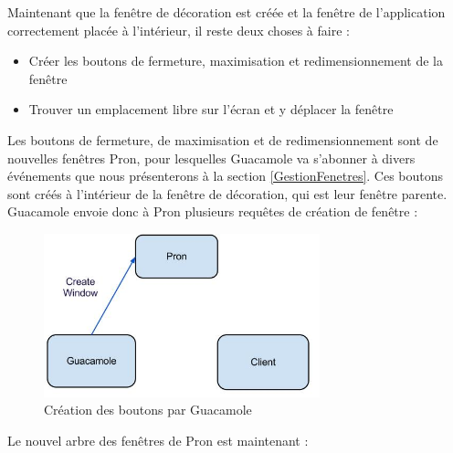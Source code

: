 \begin{center}
\end{center}

Maintenant que la fenêtre de décoration est créée et la fenêtre de l'application correctement placée à l'intérieur, il reste deux choses à faire :

\begin{itemize}
  \item Créer les boutons de fermeture, maximisation et redimensionnement de la fenêtre
  \item Trouver un emplacement libre sur l'écran et y déplacer la fenêtre
\end{itemize}

Les boutons de fermeture, de maximisation et de redimensionnement sont de nouvelles fenêtres Pron, pour lesquelles Guacamole va s'abonner à divers événements que nous présenterons à la section \ref{GestionFenetres}.
Ces boutons sont créés à l'intérieur de la fenêtre de décoration, qui est leur fenêtre parente.
Guacamole envoie donc à Pron plusieurs requêtes de création de fenêtre :

\begin{figure}[H]
  \centering
  \includegraphics[width=8cm]{images/Guacamole_anim_6.jpg}
  \caption{Création des boutons par Guacamole}
  \label{fig:guacamole_anim_6}
\end{figure}

Le nouvel arbre des fenêtres de Pron est maintenant :

\begin{center}
\end{center}

